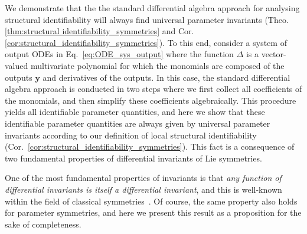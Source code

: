\documentclass[12pt]{article}
\begin{document}
We demonstrate that the the standard differential algebra approach for analysing structural identifiability will always find universal parameter invariants (Theo. \ref{thm:structural identifiability_symmetries} and Cor. \ref{cor:structural_identifiability_symmetries}). To this end, consider a system of output ODEs in Eq.~\eqref{eq:ODE_sys_output} where the function $\Delta$ is a vector-valued multivariate polynomial for which the monomials are composed of the outputs $\mathbf{y}$ and derivatives of the outputs. In this case, the standard differential algebra approach is conducted in two steps where we first collect all coefficients of the monomials, and then simplify these coefficients algebraically. This procedure yields all identifiable parameter quantities, and here we show that these identifiable parameter quantities are always given by universal parameter invariants according to our definition of local structural identifiability (Cor.~\ref{cor:structural_identifiability_symmetries}). This fact is a consequence of two fundamental properties of differential invariants of Lie symmetries.

One of the most fundamental properties of invariants is that \textit{any function of differential invariants is itself a differential invariant}, and this is well-known within the field of classical symmetries~\cite{bluman1989symmetries}. Of course, the same property also holds for parameter symmetries, and here we present this result as a proposition for the sake of completeness.  
\end{document}
